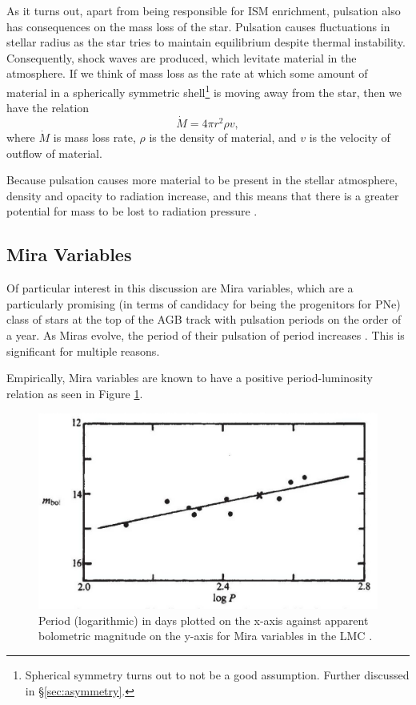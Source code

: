 \documentclass[twocolumn]{aastex63}
\begin{document}
As it turns out, apart from being responsible for ISM enrichment, pulsation also has consequences on the mass loss of the star. Pulsation causes fluctuations in stellar radius as the star tries to maintain equilibrium despite thermal instability. Consequently, shock waves are produced, which levitate material in the atmosphere. If we think of mass loss as the rate at which some amount of material in a spherically symmetric shell\footnote{Spherical symmetry turns out to not be a good assumption. Further discussed in \S \ref{sec:asymmetry}.} is moving away from the star, then we have the relation
\begin{equation}\label{eq:mlshell}
    \dot M = 4\pi r^2 \rho v,
\end{equation}
where $\dot M$ is mass loss rate, $\rho$ is the density of material, and $v$ is the velocity of outflow of material. 

Because pulsation causes more material to be present in the stellar atmosphere, density and opacity to radiation increase, and this means that there is a greater potential for mass to be lost to radiation pressure \citep{liljegren}. 

\subsection{Mira Variables} \label{subsec:mira}

Of particular interest in this discussion are Mira variables, which are a particularly promising (in terms of candidacy for being the progenitors for PNe) class of stars at the top of the AGB track with pulsation periods on the order of a year. As Miras evolve, the period of their pulsation of period increases \citep{fadeyev}. This is significant for multiple reasons. 

Empirically, Mira variables are known to have a positive period-luminosity relation \citep{robertson, glass} as seen in Figure \ref{fig:period_luminosity}.

\begin{figure}[!ht]
    \includegraphics[width=\textwidth]{period_luminosity.png}
    \caption{Period (logarithmic) in days plotted on the x-axis against apparent bolometric magnitude on the y-axis for Mira variables in the LMC \citep{glass}.}
    \label{fig:period_luminosity}
\end{figure}
\end{document}
